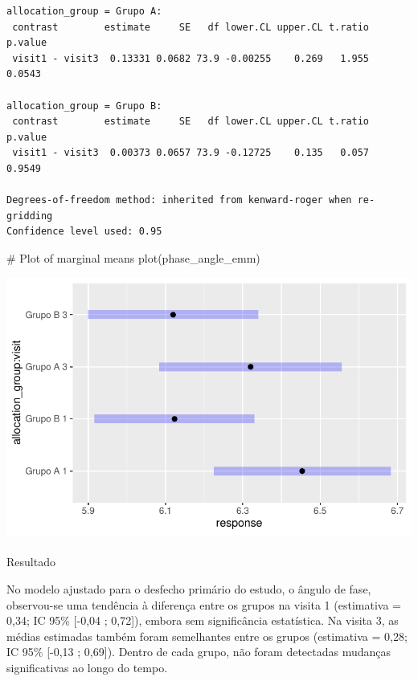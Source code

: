 \documentclass[
  12pt,
]{article}
\makeatletter
\let\oldparagraph\paragraph
\renewcommand{\paragraph}{
    \@ifstar
      \xxxParagraphStar
      \xxxParagraphNoStar
  }
\newcommand{\xxxParagraphStar}[1]{\oldparagraph*{#1}\mbox{}}
\newcommand{\xxxParagraphNoStar}[1]{\oldparagraph{#1}\mbox{}}
\newenvironment{Shaded}{\begin{snugshade}}{\end{snugshade}}
\newcommand{\CommentTok}[1]{\textcolor[rgb]{0.37,0.37,0.37}{#1}}
\newcommand{\FunctionTok}[1]{\textcolor[rgb]{0.28,0.35,0.67}{#1}}
\newcommand{\NormalTok}[1]{\textcolor[rgb]{0.00,0.23,0.31}{#1}}
\makeatother
\begin{document}
\begin{verbatim}
allocation_group = Grupo A:
 contrast        estimate     SE   df lower.CL upper.CL t.ratio p.value
 visit1 - visit3  0.13331 0.0682 73.9 -0.00255    0.269   1.955  0.0543

allocation_group = Grupo B:
 contrast        estimate     SE   df lower.CL upper.CL t.ratio p.value
 visit1 - visit3  0.00373 0.0657 73.9 -0.12725    0.135   0.057  0.9549

Degrees-of-freedom method: inherited from kenward-roger when re-gridding 
Confidence level used: 0.95 
\end{verbatim}

\begin{Shaded}
\begin{Highlighting}[]
\CommentTok{\# Plot of marginal means}
\FunctionTok{plot}\NormalTok{(phase\_angle\_emm)}
\end{Highlighting}
\end{Shaded}

\includegraphics{Outcomes_files/figure-pdf/phase_angle_sens_emm-1.pdf}

\paragraph{Resultado}\label{resultado-17}

No modelo ajustado para o desfecho primário do estudo, o ângulo de fase,
observou-se uma tendência à diferença entre os grupos na visita 1
(estimativa = 0,34; IC 95\% {[}-0,04 ; 0,72{]}), embora sem
significância estatística. Na visita 3, as médias estimadas também foram
semelhantes entre os grupos (estimativa = 0,28; IC 95\% {[}-0,13 ;
0,69{]}). Dentro de cada grupo, não foram detectadas mudanças
significativas ao longo do tempo.
\end{document}
